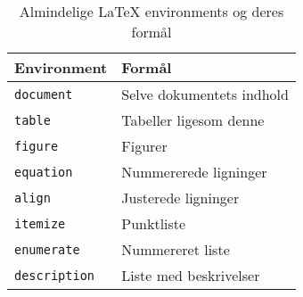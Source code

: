 

\begin{table}[htbp]
  \centering
  \begin{tabular}{ll}
    \toprule
    \textbf{Environment} & \textbf{Formål} \\
    \midrule
    \texttt{document} & Selve dokumentets indhold \\
    \texttt{table} & Tabeller ligesom denne \\
    \texttt{figure} & Figurer \\
    \texttt{equation} & Nummererede ligninger \\
    \texttt{align} & Justerede ligninger \\
    \texttt{itemize} & Punktliste \\
    \texttt{enumerate} & Nummereret liste \\
    \texttt{description} & Liste med beskrivelser \\
    \bottomrule
  \end{tabular}
  \caption{Almindelige \LaTeX{} environments og deres formål}
  \label{tab:my-table}
\end{table}